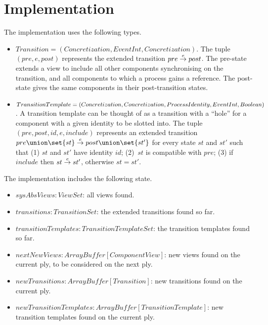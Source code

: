 \section{Implementation}

The implementation uses the following types.
\begin{itemize}
\item $Transition = (Concretization, EventInt, Concretization)$.  The tuple
  $(pre, e, post)$ represents the extended transition $pre \stackrel{e}\rightarrow post$.
  The pre-state extends a view to include all other components synchronising
  on the transition, and all components to which a process gains a reference.
  The post-state gives the same components in their post-transition states. 

\item $TransitionTemplate = (Concretization, Concretization,\linebreak[1]
  Process\-Identity,\linebreak[1] EventInt, Boolean)$.  A transition template
  can be thought of as a transition with a ``hole'' for a component with a
  given identity to be slotted into.  The tuple $(pre, post, id, e, include)$
  represents an extended transition $pre \union \set{st} \trans{e} post \union
  \set{st'}$ for every state $st$ and $st'$ such that (1) $st$ and $st'$ have
  identity $id$; (2)~$st$ is compatible with $pre$; (3) if $include$ then $st
  \stackrel{e}\rightarrow st'$, otherwise $st = st'$.
\end{itemize}


The implementation includes the following state.
\begin{itemize}
\item $sysAbsViews: ViewSet$: all views found.

\item $transitions: TransitionSet$: the extended transitions found so far.

\item $transitionTemplates: TransitionTemplateSet$: the transition templates
  found so far. 

\item $nextNewViews: ArrayBuffer[ComponentView]$: new views found on the
  current ply, to be considered on the next ply.

\item $newTransitions: ArrayBuffer[Transition]$: new transitions found on the
  current ply.

\item $newTransitionTemplates: ArrayBuffer[TransitionTemplate]$: new
  transition templates found on the current ply.
\end{itemize}

